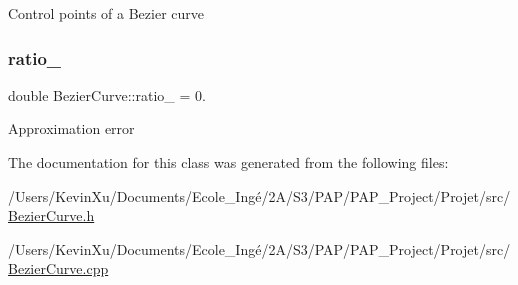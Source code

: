 Control points of a Bezier curve \mbox{\label{class_bezier_curve_a9a6d08efdae6b77334cb731f6c593142}} 
\subsubsection{\texorpdfstring{ratio\+\_\+}{ratio\_}}
{\footnotesize\ttfamily double Bezier\+Curve\+::ratio\+\_\+ = 0.\hspace{0.3cm}{\ttfamily [private]}}

Approximation error 

The documentation for this class was generated from the following files\+:\begin{DoxyCompactItemize}
\item 
/\+Users/\+Kevin\+Xu/\+Documents/\+Ecole\+\_\+\+Ingé/2\+A/\+S3/\+P\+A\+P/\+P\+A\+P\+\_\+\+Project/\+Projet/src/\mbox{\hyperlink{_bezier_curve_8h}{Bezier\+Curve.\+h}}\item 
/\+Users/\+Kevin\+Xu/\+Documents/\+Ecole\+\_\+\+Ingé/2\+A/\+S3/\+P\+A\+P/\+P\+A\+P\+\_\+\+Project/\+Projet/src/\mbox{\hyperlink{_bezier_curve_8cpp}{Bezier\+Curve.\+cpp}}\end{DoxyCompactItemize}
